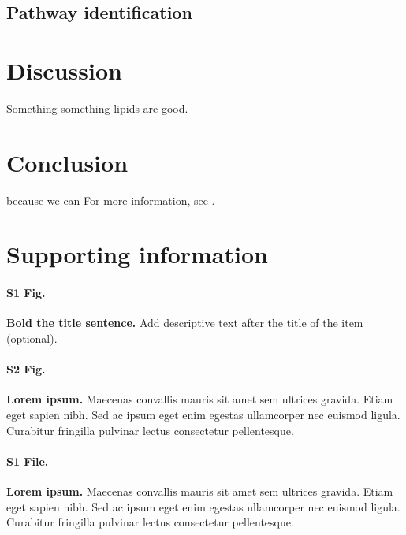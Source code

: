 \documentclass[10pt,letterpaper]{article}
\begin{document}
\subsection*{Pathway identification}








\section*{Discussion}
Something something lipids are good. 


\section*{Conclusion}

because we can For more information, see .

\section*{Supporting information}

\paragraph*{S1 Fig.}
\label{S1_Fig}
{\bf Bold the title sentence.} Add descriptive text after the title of the item (optional).

\paragraph*{S2 Fig.}
\label{S2_Fig}
{\bf Lorem ipsum.} Maecenas convallis mauris sit amet sem ultrices gravida. Etiam eget sapien nibh. Sed ac ipsum eget enim egestas ullamcorper nec euismod ligula. Curabitur fringilla pulvinar lectus consectetur pellentesque.

\paragraph*{S1 File.}
\label{S1_File}
{\bf Lorem ipsum.}  Maecenas convallis mauris sit amet sem ultrices gravida. Etiam eget sapien nibh. Sed ac ipsum eget enim egestas ullamcorper nec euismod ligula. Curabitur fringilla pulvinar lectus consectetur pellentesque.
\end{document}
